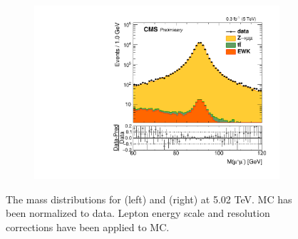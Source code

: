 \begin{figure}
\begin{subfigure}{.50\textwidth}
\end{subfigure}%
\centering
\begin{subfigure}{.50\textwidth}
\centering
\includegraphics[width=\linewidth]{plots/Z/5tev/zmmlog.pdf}
\end{subfigure}%
\caption{The mass distributions for \zee (left) and \zmm (right) at 5.02 TeV. MC has been normalized to data. Lepton energy scale and resolution corrections have been applied to MC.}
\label{fig:z:z:5}
\end{figure}